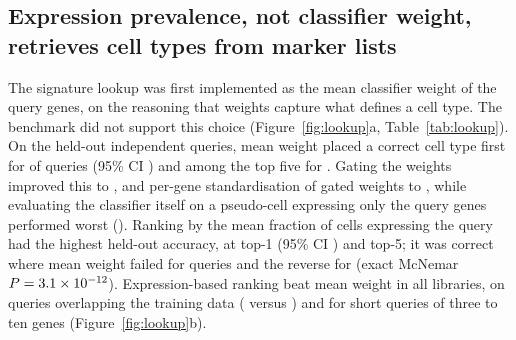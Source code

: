 \documentclass[11pt]{article}
\begin{document}
\subsection{Expression prevalence, not classifier weight, retrieves cell types from marker lists}

The signature lookup was first implemented as the mean classifier weight of the query genes, on the reasoning that weights capture what defines a cell type. The benchmark did not support this choice (Figure~\ref{fig:lookup}a, Table~\ref{tab:lookup}). On the \lkTest{} held-out independent queries, mean weight placed a correct cell type first for \lkWmeanTopOne{} of queries (95\% CI \lkWmeanTopOneCI{}) and among the top five for \lkWmeanTopFive{}. Gating the weights improved this to \lkWgatedTopOne{}, and per-gene standardisation of gated weights to \lkWgenezTopOne{}, while evaluating the classifier itself on a pseudo-cell expressing only the query genes performed worst (\lkPseudoTopOne{}). Ranking by the mean fraction of cells expressing the query had the highest held-out accuracy, at \lkExprTopOne{} top-1 (95\% CI \lkExprTopOneCI{}) and \lkExprTopFive{} top-5; it was correct where mean weight failed for \lkDisc{} queries and the reverse for \lkDiscRev{} (exact McNemar $P = 3.1\times10^{-12}{}$). Expression-based ranking beat mean weight in all \lkLibExprGtWmean{} libraries, on queries overlapping the training data (\lkOvExprTopOne{} versus \lkOvWmeanTopOne{}) and for short queries of three to ten genes (Figure~\ref{fig:lookup}b).
\end{document}
